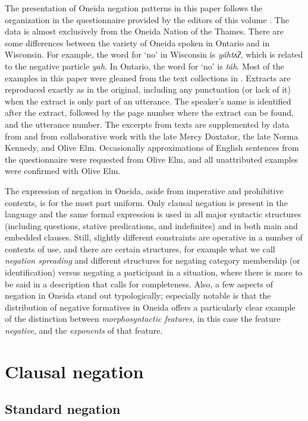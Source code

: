 \documentclass[output=paper,colorlinks,citecolor=brown]{langscibook}
\begin{document}
The presentation of Oneida negation patterns in this paper follows the organization in the questionnaire provided by the editors of this volume . The data is almost exclusively from the Oneida Nation of the Thames. There are some differences between the variety of Oneida spoken in Ontario and in Wisconsin. For example, the word for `no' in Wisconsin is \textit{yáhtʌʔ}, which is related to the negative particle \textit{yah}. In Ontario, the word for `no' is \textit{táh}.
Most of the examples in this paper were gleaned from the text collections in \citet{MichelsonEtAl2016}. Extracts are reproduced exactly as in the original, including any punctuation (or lack of it) when the extract is only part of an utterance. The speaker's name is identified after the extract, followed by the page number where the extract can be found, and the utterance number. The excerpts from texts are supplemented by data from \citet{MichelsonDoxtator2002} and from collaborative work with the late Mercy Doxtator, the late Norma Kennedy, and Olive Elm. Occasionally approximations of English sentences from the questionnaire were requested from Olive Elm, and all unattributed examples were confirmed with Olive Elm.

The expression of negation in Oneida, aside from imperative and prohibitive contexts, is for the most part uniform. Only clausal negation is present in the language and the same formal expression is used in all major syntactic structures (including questions, stative predications, and indefinites) and in both main and embedded clauses. Still, slightly different constraints are operative in a number of contexts of use, and there are certain structures, for example what we call \textit{negation spreading} and different structures for negating category membership (or identification) versus negating a participant in a situation, where there is more to be said in a description that calls for completeness. Also, a few aspects of negation in Oneida stand out typologically; especially notable is that the distribution of negative formatives in Oneida offers a particularly clear example of the distinction between  \textit{morphosyntactic features}, in this case the feature \textit{negative}, and the \textit{exponents} of that feature.

\section{Clausal negation}

\subsection{Standard negation}
\label{oneida:sec:standard}
\end{document}
